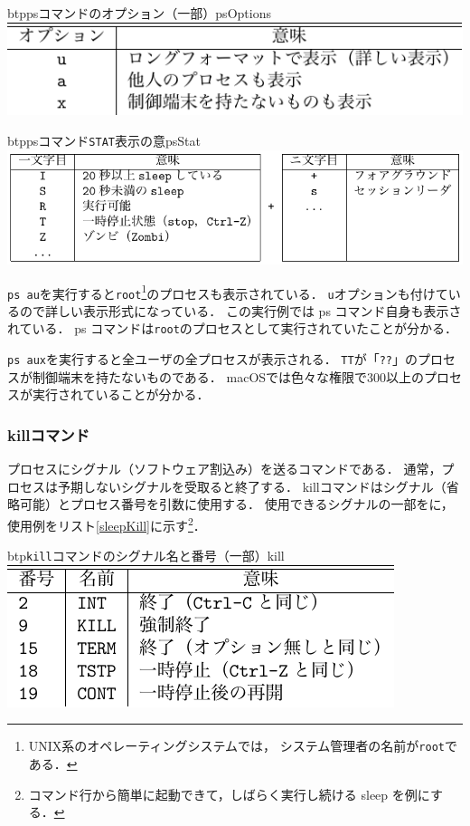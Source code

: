 \begin{mytable}{btp}{psコマンドのオプション（一部）}{psOptions}
  \includegraphics[scale=1.0]{Tbl/psOptions.pdf}
\end{mytable}



\begin{mytable}{btp}{psコマンド\texttt{STAT}表示の意}{psStat}
  \includegraphics[scale=1.0]{Tbl/psStat.pdf}
\end{mytable}

\texttt{ps au}を実行すると\texttt{root}\footnote{
UNIX系のオペレーティングシステムでは，
システム管理者の名前が\texttt{root}である．}のプロセスも表示されている．
\texttt{u}オプションも付けているので詳しい表示形式になっている．
この実行例では ps コマンド自身も表示されている．
ps コマンドは\texttt{root}のプロセスとして実行されていたことが分かる．

\texttt{ps aux}を実行すると全ユーザの全プロセスが表示される．
\texttt{TT}が「\texttt{??}」のプロセスが制御端末を持たないものである．
macOSでは色々な権限で300以上のプロセスが実行されていることが分かる．

\subsubsection{killコマンド}

プロセスにシグナル（ソフトウェア割込み）を送るコマンドである．
通常，プロセスは予期しないシグナルを受取ると終了する．
killコマンドはシグナル（省略可能）とプロセス番号を引数に使用する．
使用できるシグナルの一部をに，
使用例をリスト\ref{sleepKill}に示す\footnote{
コマンド行から簡単に起動できて，しばらく実行し続ける sleep を例にする．
}．

\begin{mytable}{btp}{\texttt{kill}コマンドのシグナル名と番号（一部）}{kill}
  \includegraphics[scale=1.0]{Tbl/killOptions.pdf}
\end{mytable}

